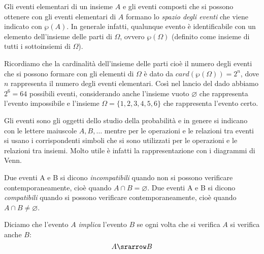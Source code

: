 Gli eventi elementari di un insieme \(A\) e gli eventi composti che si 
possono ottenere con gli eventi elementari di \(A\) formano lo \emph{spazio 
degli eventi} che viene indicato con \(\wp (A)\). 
In generale infatti, qualunque evento è identificabile con
un elemento dell'insieme delle parti di \(\Omega\), ovvero \(\wp (\Omega )\) 
(definito come insieme di tutti i sottoinsiemi di \(\Omega\)).

\begin{osservazione}
 Ricordiamo che la cardinalità dell'insieme delle parti cioè il numero 
degli eventi che si possono formare con gli elementi di \(\Omega \) è dato da 
\(\mathit{card}(\wp (\Omega ))=2^n\), dove \(n\) rappresenta il numero degli 
eventi elementari. 
Così nel lancio del dado abbiamo \(2^6=64\) possibili eventi, 
considerando anche l'insieme vuoto \(\varnothing \) che rappresenta l'evento 
impossibile e l'insieme \(\Omega =\{1,2,3,4,5,6\}\) che rappresenta l'evento 
certo.
\end{osservazione}

\vspace{.5em}
Gli eventi sono gli oggetti dello studio della probabilità e in genere si 
indicano con le lettere maiuscole \(A,B,\ldots \) mentre per le operazioni e 
le relazioni tra eventi si usano i corrispondenti simboli che si sono 
utilizzati per le operazioni e le relazioni tra insiemi. Molto utile è 
infatti la rappresentazione con i diagrammi di Venn. 

\begin{definizione}
Due eventi A e B si dicono \emph{incompatibili} quando non si possono 
verificare 
contemporaneamente, cioè quando \(A\cap B=\varnothing \).
Due eventi A e B si dicono \emph{compatibili} quando si possono verificare 
contemporaneamente, cioè quando \(A\cap B\neq \varnothing \).
\end{definizione}


\begin{definizione}
Diciamo che l'evento \(A\) \emph{implica} l'evento \(B\) se ogni volta che si 
verifica \(A\) si verifica anche \(B\):
\[A \srarrow B\]
\end{definizione}


